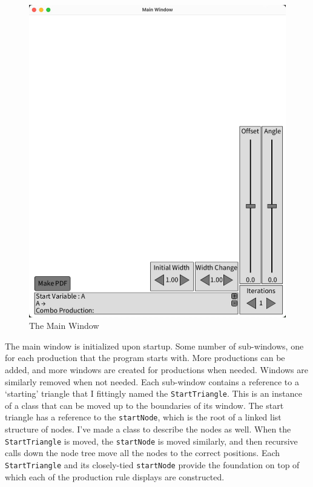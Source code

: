 \documentclass[12pt,twoside]{reedthesis}
\newcommand{\code}[1]{\texttt{#1}}
\begin{document}
	\begin{figure}[h!]
	\centering
	\includegraphics[scale=0.5]{Images/HowItWorks1}
	\caption{The Main Window}
	\label {MainWindow}
	\end{figure}

	
	The main window is initialized upon startup. Some number of sub-windows, one for each production that the program starts with. More productions can be added, and more windows are created for productions when needed. Windows are similarly removed when not needed. Each sub-window contains a reference to a `starting' triangle that I fittingly named the \code{StartTriangle}. This is an instance of a class that can be moved up to the boundaries of its window. The start triangle has a reference to the \code{startNode}, which is the root of a linked list structure of nodes. I've made a class to describe the nodes as well. When the \code{StartTriangle} is moved, the \code{startNode} is moved similarly, and then recursive calls down the node tree move all the nodes to the correct positions. Each \code{StartTriangle} and its closely-tied \code{startNode} provide the foundation on top of which each of the production rule displays are constructed.
	
\end{document}
